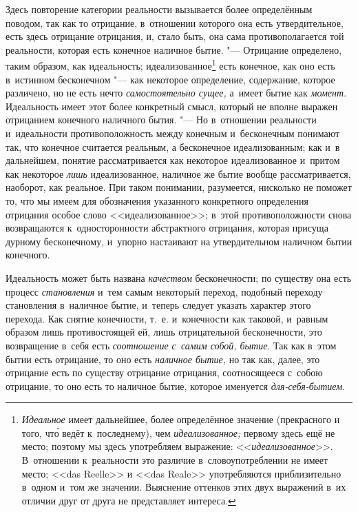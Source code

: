 Здесь повторение категории реальности вызывается более определённым поводом,
так как то отрицание, в~отношении которого она есть утвердительное, есть
здесь отрицание отрицания, и, стало быть, она сама противополагается той
реальности, которая есть конечное наличное бытие. "--- Отрицание определено,
таким образом, как идеальность; идеализованное\footnote{{\em Идеальное}
имеет дальнейшее, более определённое значение (прекрасного и
того, чт\'{о} ведёт к~последнему), чем {\em идеализованное;} первому здесь ещё
не место; поэтому мы здесь употребляем выражение: <<{\em идеализованное}>>.
В~отношении к~реальности это различие в~словоупотреблении не имеет место;
<<das Reelle>> и <<das Reale>> употребляются приблизительно в~одном и~том же
значении. Выяснение оттенков этих двух выражений в~их отличии друг от друга
не представляет интереса.} есть конечное, как оно есть в~истинном
бесконечном "--- как некоторое определение, содержание, которое различено, но
не есть нечто {\em самостоятельно сущее,} а~имеет бытие
как {\em момент}. Идеальность имеет этот более
конкретный смысл, который не вполне выражен отрицанием конечного наличного
бытия. "--- Но в~отношении реальности и~идеальности противоположность между
конечным и~бесконечным понимают так, что конечное считается реальным, а
бесконечное идеализованным; как и~в дальнейшем, понятие рассматривается как
некоторое идеализованное и~притом как некоторое
{\em лишь} идеализованное, наличное же бытие вообще
рассматривается, наоборот, как реальное. При таком понимании, разумеется,
нисколько не поможет то, что мы имеем для обозначения указанного
конкретного определения отрицания особое слово <<идеализованное>>; в~этой
противоположности снова возвращаются к~односторонности абстрактного
отрицания, которая присуща дурному бесконечному, и~упорно настаивают на
утвердительном наличном бытии конечного.


Идеальность может быть названа {\em качеством}
бесконечности; по существу она есть процесс
{\em становления} и~тем самым некоторый переход,
подобный переходу становления в~наличное бытие, и~теперь следует указать
характер этого перехода. Как снятие конечности, т.~е. и~конечности как
таковой, и~равным образом лишь противостоящей ей, лишь отрицательной
бесконечности, это возвращение в~себя есть
{\em соотношение с~самим собой, бытие}. Так как в~этом бытии есть отрицание, то
оно есть {\em наличное бытие,} но так как, далее, это отрицание есть
по существу отрицание отрицания, соотносящееся с~собою отрицание, то
оно есть то наличное бытие, которое именуется {\em для-себя-бытием}.

